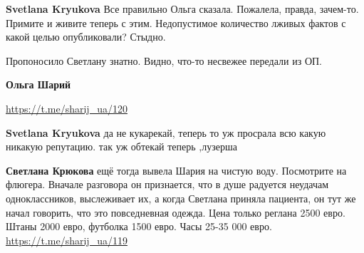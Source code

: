 \begin{itemize}
\begin{itemize}
 
\textbf{Svetlana Kryukova} Все правильно Ольга сказала. Пожалела, правда, зачем-то. Примите и живите теперь с этим. Недопустимое количество лживых фактов с какой целью опубликовали? Стыдно.

 
Пропоносило Светлану знатно. Видно, что-то несвежее передали из ОП.

 
\textbf{Ольга Шарий}

 
\url{https://t.me/sharij_ua/120}

 
\textbf{Svetlana Kryukova} да не кукарекай, теперь то уж просрала всю какую никакую репутацию. так уж обтекай теперь ,лузерша


 
\textbf{Светлана Крюкова} ещё тогда вывела Шария на чистую воду. Посмотрите на флюгера. Вначале разговора он признается, что в душе радуется неудачам одноклассников, выслеживает их, а когда Светлана приняла пациента, он тут же начал говорить, что это повседневная одежда. Цена только реглана 2500 евро. Штаны 2000 евро, футболка 1500 евро. Часы 25-35 000 евро. \url{https://t.me/sharij_ua/119}


\end{itemize}
\end{itemize}
